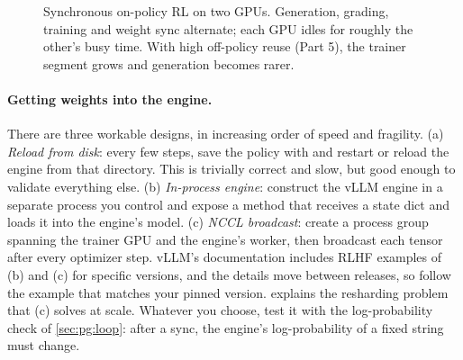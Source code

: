 \begin{figure}[t]
\centering
{}
\caption{Synchronous on-policy RL on two GPUs. Generation, grading, training and weight sync
alternate; each GPU idles for roughly the other's busy time. With high off-policy reuse (Part 5),
the trainer segment grows and generation becomes rarer.}
\label{fig:proj5:timeline}
\end{figure}

\paragraph{Getting weights into the engine.} There are three workable designs, in increasing
order of speed and fragility. (a) \emph{Reload from disk}: every few steps, save the policy with
 and restart or reload the engine from that directory. This is trivially
correct and slow, but good enough to validate everything else. (b) \emph{In-process engine}:
construct the vLLM engine in a separate process you control and expose a method that receives a
state dict and loads it into the engine's model. (c) \emph{NCCL broadcast}: create a process group
spanning the trainer GPU and the engine's worker, then broadcast each tensor after every optimizer
step. vLLM's documentation includes RLHF examples of (b) and (c) for specific versions, and the
details move between releases, so follow the example that matches your pinned version.
 explains the resharding problem that (c) solves at scale. Whatever you
choose, test it with the log-probability check of \cref{sec:pg:loop}: after a sync, the engine's
log-probability of a fixed string must change.

